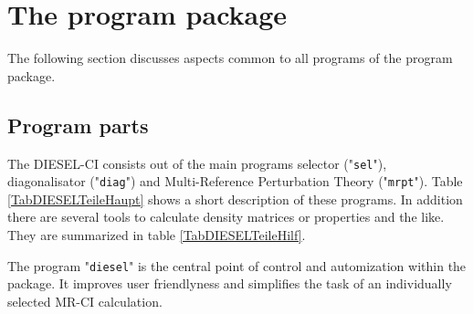 \section{The program package}

The following section discusses aspects common to all programs of the
program package.


\subsection{Program parts}
The DIESEL-CI consists out of the main programs selector ("{\tt sel}"),
diagonalisator ("{\tt diag}") and Multi-Reference Perturbation Theory
("{\tt mrpt}"). Table \ref{TabDIESELTeileHaupt} shows a short description
of these programs. In addition 
there are several tools to calculate density matrices or properties
and the like. They are summarized in table \ref{TabDIESELTeileHilf}.

The program "{\tt diesel}" is the central point of control 
and automization within the package. It improves user friendlyness and
simplifies the task of an individually selected MR-CI calculation.



